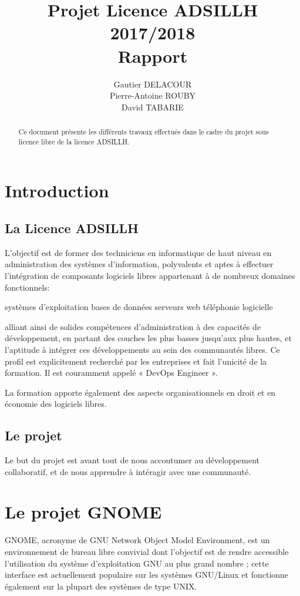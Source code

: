 \documentclass[12pt]{report}
\title{Projet Licence ADSILLH 2017/2018\\Rapport}
\author{Gautier DELACOUR\\Pierre-Antoine ROUBY\\David TABARIE} %
\begin{document}
\maketitle

\begin{abstract}
Ce document présente les différents travaux effectués dans le cadre du projet sous licence libre de la licence ADSILLH.

\end{abstract}

\tableofcontents

\chapter{Introduction}

\section{La Licence ADSILLH}
L'objectif est de former des techniciens en informatique de haut
niveau en administration des systèmes d'information, polyvalents et
aptes à effectuer l'intégration de composants logiciels libres
appartenant à de nombreux domaines fonctionnels:

systèmes d'exploitation
bases de données
serveurs web
téléphonie logicielle

alliant ainsi de solides compétences d'administration à des capacités
de développement, en partant des couches les plus basses jusqu'aux
plus hautes, et l'aptitude à intégrer ces développements au sein des
communautés libres. Ce profil est explicitement recherché par les
entreprises et fait l'unicité de la formation. Il est couramment
appelé « DevOps Engineer ».

La formation apporte également des aspects organisationnels en droit
et en économie des logiciels libres.

\section{Le projet}
Le but du projet est avant tout de nous accoutumer au développement
collaboratif, et de nous apprendre à intéragir avec une communauté.

\chapter{Le projet GNOME}
GNOME, acronyme de GNU Network Object Model Environment, est un
environnement de bureau libre convivial dont l'objectif est de rendre
accessible l'utilisation du système d'exploitation GNU au plus grand
nombre ; cette interface est actuellement populaire sur les systèmes
GNU/Linux et fonctionne également sur la plupart des systèmes de type
UNIX.
\end{document}
